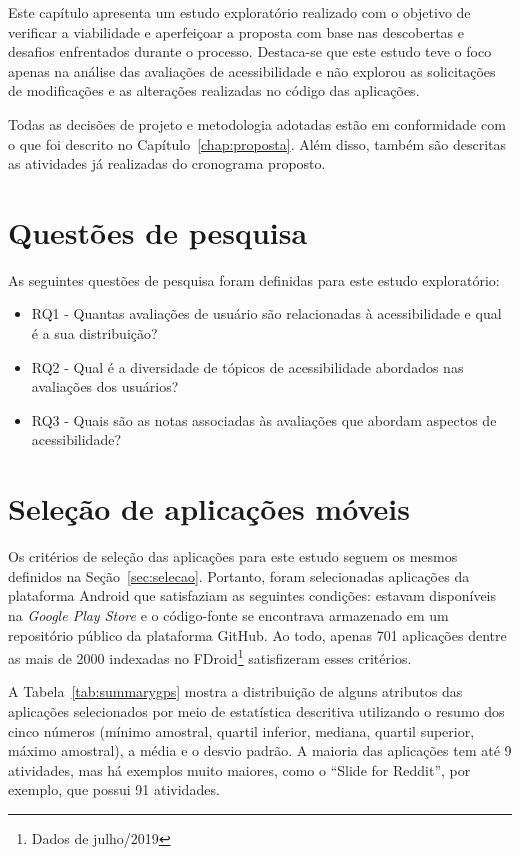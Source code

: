Este capítulo apresenta um estudo exploratório realizado com o objetivo de verificar a viabilidade e aperfeiçoar a proposta com base nas descobertas e desafios enfrentados durante o processo. Destaca-se que este estudo teve o foco apenas na análise das avaliações de acessibilidade e não explorou as solicitações de modificações e as alterações realizadas no código das aplicações. 


Todas as decisões de projeto e metodologia adotadas estão em conformidade com o que foi descrito no Capítulo~\ref{chap:proposta}.
Além disso, também são descritas as atividades já realizadas do cronograma proposto.

\section{Questões de pesquisa}

As seguintes questões de pesquisa foram definidas para este estudo exploratório:
\begin{itemize}
 \item RQ1 - Quantas avaliações de usuário são relacionadas à acessibilidade e qual é a sua distribuição? 
 \item RQ2 - Qual é a diversidade de tópicos de acessibilidade abordados nas avaliações dos usuários?
 \item RQ3 - Quais são as notas associadas às avaliações que abordam aspectos de acessibilidade?  
\end{itemize}

\section{Seleção de aplicações móveis}

Os critérios de seleção das aplicações para este estudo seguem os mesmos definidos na Seção~\ref{sec:selecao}. Portanto, foram selecionadas aplicações da plataforma Android que satisfaziam as seguintes condições: estavam disponíveis na \textit{Google Play Store} e o código-fonte se encontrava armazenado em um repositório público da plataforma GitHub. Ao todo, apenas 701 aplicações dentre as mais de 2000 indexadas no FDroid\footnote{Dados de julho/2019} satisfizeram esses critérios.

A Tabela~\ref{tab:summarygps} mostra a distribuição de alguns atributos das aplicações selecionados por meio de estatística descritiva utilizando o resumo dos cinco números (mínimo amostral, quartil inferior, 
mediana, quartil superior, máximo amostral), a média e o desvio padrão. 
A maioria das aplicações tem até 9 atividades, mas há exemplos muito maiores, como o ``Slide for Reddit'', por exemplo, que possui 91 atividades.

